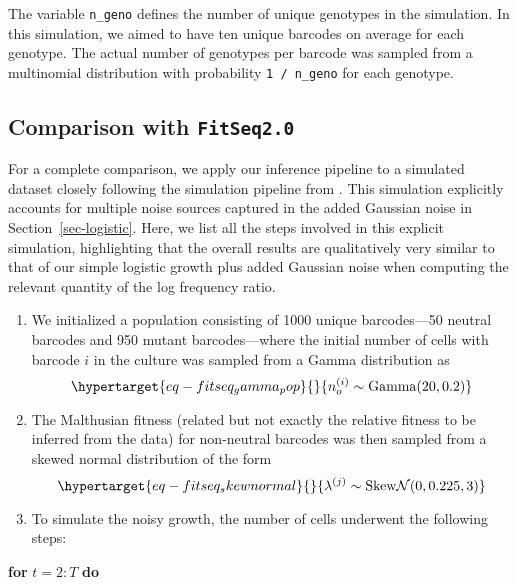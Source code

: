 \documentclass[
]{scrartcl}
\begin{document}
\begin{refsegment}
The variable \texttt{n\_geno} defines the number of unique genotypes in
the simulation. In this simulation, we aimed to have ten unique barcodes
on average for each genotype. The actual number of genotypes per barcode
was sampled from a multinomial distribution with probability
\texttt{1\ /\ n\_geno} for each genotype.

\hypertarget{sec-fitseq2}{%
\subsection{\texorpdfstring{Comparison with
\texttt{FitSeq2.0}}{Comparison with FitSeq2.0}}\label{sec-fitseq2}}

For a complete comparison, we apply our inference pipeline to a
simulated dataset closely following the simulation pipeline from
\textcite{li2023}. This simulation explicitly accounts for multiple
noise sources captured in the added Gaussian noise in
Section~\ref{sec-logistic}. Here, we list all the steps involved in this
explicit simulation, highlighting that the overall results are
qualitatively very similar to that of our simple logistic growth plus
added Gaussian noise when computing the relevant quantity of the log
frequency ratio.

\begin{enumerate}
\def\labelenumi{\arabic{enumi}.}
\item
  We initialized a population consisting of 1000 unique barcodes---50
  neutral barcodes and 950 mutant barcodes---where the initial number of
  cells with barcode \(i\) in the culture was sampled from a Gamma
  distribution as
  \begin{equation}\protect\hypertarget{eq-fitseq_gamma_pop}{}{
  n_o^{(i)} \sim \text{Gamma}(20, 0.2)
  }\label{eq-fitseq_gamma_pop}\end{equation}
\item
  The Malthusian fitness (related but not exactly the relative fitness
  to be inferred from the data) for non-neutral barcodes was then
  sampled from a skewed normal distribution of the form
  \begin{equation}\protect\hypertarget{eq-fitseq_skewnormal}{}{
  \lambda^{(j)} \sim \text{Skew}\mathcal{N}(0, 0.225, 3)
  }\label{eq-fitseq_skewnormal}\end{equation}
\item
  To simulate the noisy growth, the number of cells underwent the
  following steps:
\end{enumerate}

\textbf{for} \(t=2:T\) \textbf{do}


\end{refsegment}
\end{document}

